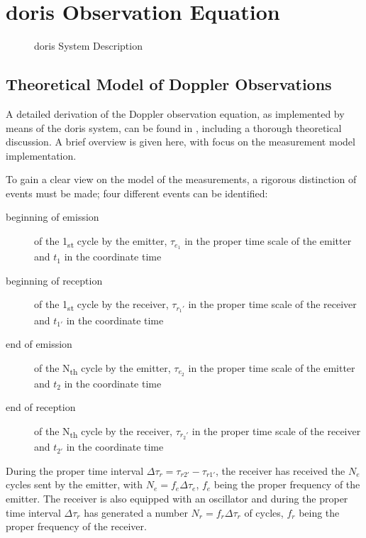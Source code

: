 \section{\gls{doris} Observation Equation}\label{sec:doris-observation-equation}

\begin{figure}
  \centering
  
  \caption{\gls{doris} System Description}
  \label{fig:doris-system-description}
\end{figure}

\subsection{Theoretical Model of Doppler Observations}\label{ssec:doris-obs-theory}
A detailed derivation of the Doppler observation equation, as implemented by means of the 
\gls{doris} system, can be found in \cite{Lemoine2016}, including a thorough theoretical 
discussion. A brief overview is given here, with focus on the measurement model 
implementation.

To gain a clear view on the model of the measurements, a rigorous distinction of 
events must be made; four different events can be identified:
\begin{description}
    \item[beginning of emission] of the 1\textsubscript{st} cycle by the emitter, 
    \(\tau_{e_1}\) in the proper time scale of the emitter and \(t_1\) in the coordinate 
    time
    
    \item[beginning of reception] of the 1\textsubscript{st} cycle by the receiver, 
    \(\tau_{r_1'}\) in the proper time scale of the receiver and 
    \(t_{1'}\) in the coordinate time

    \item[end of emission] of the N\textsubscript{th} cycle by the emitter, 
    \(\tau_{e_2}\) in the proper time scale of the emitter and \(t_2\) in the coordinate 
    time
    
    \item[end of reception] of the N\textsubscript{th} cycle by the receiver, 
    \(\tau_{r_2'}\) in the proper time scale of the receiver and 
    \(t_{2'}\) in the coordinate time
\end{description}

During the proper time interval $\Delta\tau_{r} = \tau_{r2'} - \tau_{r1'}$, 
the receiver has received the $N_e$ cycles sent by the emitter, with $N_e = f_e \Delta\tau_e$, 
$f_e$ being the proper frequency of the emitter. The receiver is also equipped with
an oscillator and during the proper time interval $\Delta\tau_{r}$ has generated 
a number $N_r = f_r \Delta\tau_r$ of cycles, $f_r$ being the proper frequency of the 
receiver.

